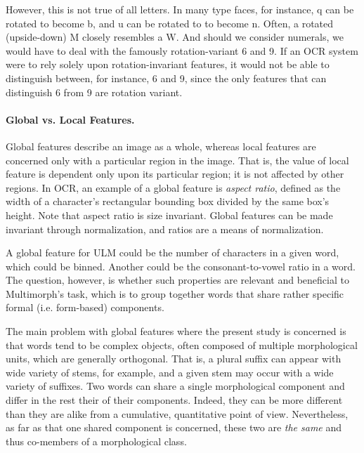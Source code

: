  
However, this is not true of all letters. In many type faces, for instance, 
\textsf{q} can be rotated to become \textsf{b}, and \textsf{u} can be rotated to 
to become \textsf{n}. Often, a rotated (upside-down) \textsf{M} closely 
resembles a \textsf{W}. And should we consider numerals, we would have to deal 
with the famously rotation-variant \textsf{6} and \textsf{9}. If an 
\ac{OCR} system were to rely solely upon rotation-invariant features, it
would not be able to distinguish between, for instance, \textsf{6} and 
\textsf{9}, since the only features that can distinguish \textsf{6} from \textsf{9}
are rotation variant.

\paragraph{Global vs. Local Features.}
Global features describe an image as a whole, whereas local features are concerned
only with a particular region in the image. That is, the value of local feature is dependent
only upon its particular region; it is not affected by other regions. 
In \ac{OCR}, an example of a global feature is \emph{aspect ratio}, defined 
as the width of a character's rectangular bounding box divided by the same 
box's height. Note that aspect ratio is size invariant. Global features 
can be made invariant 
through normalization, and ratios are a means of normalization.

A global feature for ULM could be the number 
of characters in a given word, which could be binned. Another 
could be the consonant-to-vowel ratio in a word. The question, however, is 
whether such properties are relevant and beneficial to Multimorph's task,
which is to group together words that share rather specific formal (i.e. form-based) components. 

The main problem with global features where the present study is concerned is that
words tend to be complex objects, often composed of 
multiple morphological units, which are 
generally orthogonal. That is, a plural suffix can 
appear with wide variety of stems, for example, and a 
given stem may occur with a wide variety of suffixes.
Two words can share a single morphological component and 
differ in the rest their of their components. Indeed,
they can be more different than they are alike from a cumulative, 
quantitative point of view. Nevertheless,
as far as that one shared component is concerned, these two are 
\emph{the same} and thus co-members of a morphological
class. 

